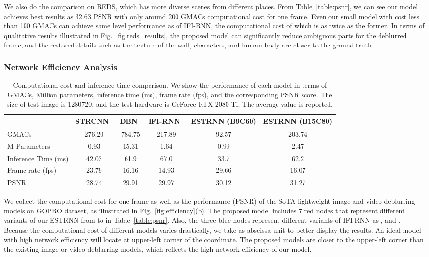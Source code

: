 \documentclass[twocolumn]{svjour3}          \smartqed  \usepackage{graphicx}
\begin{document}
We also do the comparison on REDS, which has more diverse scenes from different places. From Table~\ref{table:psnr}, we can see our model  achieves best results as 32.63 PSNR with only around 200 GMACs computational cost for one  frame. Even our small model  with cost less than 100 GMACs can achieve same level performance as  of IFI-RNN, the computational cost of which is as twice as the former. In terms of qualitative results illustrated in Fig.~\ref{fig:reds_results}, the proposed model can significantly reduce ambiguous parts for the deblurred frame, and the restored details such as the texture of the wall, characters, and human body are closer to the ground truth.

\subsubsection{Network Efficiency Analysis}
\begin{table*}[ht]
  \caption{Computational cost and inference time comparison. We show the performance of each model in terms of GMACs, Million parameters, inference time (ms), frame rate (fps), and the corresponding PSNR score. The size of test image is 1280720, and the test hardware is GeForce RTX 2080 Ti. The average value is reported.}
  \label{tab:cost_comparison}
  \centering
  \begin{tabular}{lccccc}
    \toprule
    & STRCNN~\cite{hyun2017online} & DBN~\cite{su2017deep} & IFI-RNN~\cite{nah2019recurrent} & ESTRNN (B9C60) & ESTRNN (B15C80)\\
    \midrule
    GMACs & 276.20 & 784.75 & 217.89 & 92.57 & 203.74\\
    M Parameters& 0.93 & 15.31 & 1.64 & 0.99 & 2.47\\
    Inference Time (ms) & 42.03 & 61.9 & 67.0 & 33.7 & 62.2\\
    Frame rate (fps) & 23.79 & 16.16 & 14.93 & 29.66 & 16.07\\
    PSNR & 28.74 & 29.91 & 29.97 & 30.12 & 31.27 \\
    \bottomrule
  \end{tabular}
\end{table*}

We collect the computational cost for one frame as well as the performance (PSNR) of the SoTA lightweight image and video deblurring models on GOPRO dataset, as illustrated in Fig.~\ref{fig:efficiency}(b). The proposed model includes 7 red nodes that represent different variants of our ESTRNN from  to  in Table~\ref{table:psnr}. Also, the three blue nodes represent different variants of IFI-RNN as ,  and . Because the computational cost of different models varies drastically, we take  as abscissa unit to better display the results. An ideal model with high network efficiency will locate at upper-left corner of the coordinate. The proposed models are closer to the upper-left corner than the existing image or video deblurring models, which reflects the high network efficiency of our model.
\end{document}
